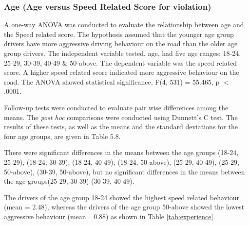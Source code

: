 \documentclass[preprint,12pt,a4paper,authoryear]{elsarticle}
\begin{document}
\subsubsection{Age (Age versus Speed Related Score for violation) }

A one-way ANOVA was conducted to evaluate the relationship between age and the Speed related score. The hypothesis assumed that the younger age group drivers have more aggressive driving behaviour on the road than the older age group drivers. The independent variable tested, age, had five age ranges: 18-24, 25-29, 30-39, 40-49 \& 50-above. The dependent variable was the speed related score. A higher speed related score indicated more aggressive behaviour on the road. The ANOVA showed statistical significance, F(4, 531) = 55.465, p $<$ .0001.

Follow-up tests were conducted to evaluate pair wise differences among the means. The \textit{post hoc} comparisons were conducted using Dunnett's C test. The results of these tests, as well as the means and the standard deviations for the four age groups, are given in Table 5.8. 

There were significant differences in the means between the age groups (18-24, 25-29), (18-24, 30-39), (18-24, 40-49), (18-24, 50-above), (25-29, 40-49), (25-29, 50-above), (30-39, 50-above),  but no significant differences in the means between the age groups(25-29, 30-39) (30-39, 40-49). 

The drivers of the age group 18-24 showed the highest speed related behaviour (mean = 2.48), whereas the drivers of the age group 50-above showed the lowest aggressive behaviour (mean= 0.88) as shown in Table \ref{tab:experience}.
\end{document}
